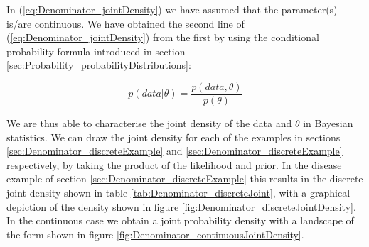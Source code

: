 \documentclass[11pt,fullpage]{book}
\begin{document}
In (\ref{eq:Denominator_jointDensity}) we have assumed that the parameter(s) is/are continuous. We have obtained the second line of (\ref{eq:Denominator_jointDensity}) from the first by using the conditional probability formula introduced in section \ref{sec:Probability_probabilityDistributions}:

\begin{equation}
p(data|\theta) = \frac{p(data,\theta)}{p(\theta)}
\end{equation} 

We are thus able to characterise the joint density of the data and $\theta$ in Bayesian statistics. We can draw the joint density for each of the examples in sections \ref{sec:Denominator_discreteExample} and \ref{sec:Denominator_discreteExample} respectively, by taking the product of the likelihood and prior. In the disease example of section \ref{sec:Denominator_discreteExample} this results in the discrete joint density shown in table \ref{tab:Denominator_discreteJoint}, with a graphical depiction of the density shown in figure \ref{fig:Denominator_discreteJointDensity}. In the continuous case we obtain a joint probability density with a landscape of the form shown in figure \ref{fig:Denominator_continuousJointDensity}.
\end{document}
